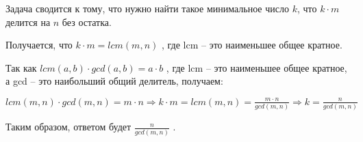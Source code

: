 \solutionSection

Задача сводится к тому, что нужно найти такое минимальное число $k$, что $k \cdot m$ делится на $n$ без остатка.

Получается, что $k \cdot m = lcm(m, n)$ , где lcm -- это наименьшее общее кратное.

Так как $lcm(a, b) \cdot gcd(a, b) = a \cdot b$ , где lcm -- это наименьшее общее кратное, а gcd -- это наибольший общий делитель, получаем:

$lcm(m, n) \cdot gcd(m, n) = m \cdot n \Rightarrow k \cdot m = lcm(m, n) = \frac{m \cdot n}{gcd(m, n)} \Rightarrow k = \frac{n}{gcd(m, n)}$

Таким образом, ответом будет $\frac{n}{gcd(m, n)}$ .

\codeExample

